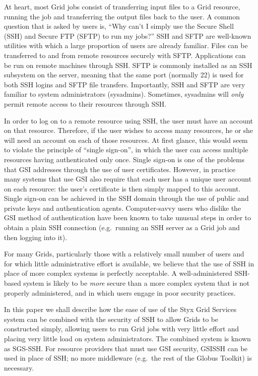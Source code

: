 \documentclass[times,10pt,twocolumn,8.5x11]{article}
\begin{document}
At heart, most Grid jobs consist of transferring input files to a Grid resource, running the job and transferring the output files back to the user.  A common question that is asked by users is, ``Why can't I simply use the Secure Shell (SSH) and Secure FTP (SFTP) to run my jobs?''  SSH and SFTP are 
well-known utilities with which a large proportion of users are already familiar.  Files can be transferred to and from remote resources securely with SFTP.  Applications can be run on remote machines through SSH.  SFTP is commonly installed as an SSH subsystem on the server, meaning that the same port (normally 22) is used for both SSH logins and SFTP file transfers.   Importantly, SSH and SFTP are very familiar to system administrators (sysadmins).  Sometimes, sysadmins will {\em only\/} permit remote access to their resources through SSH.

In order to log on to a remote resource using SSH, the user must have an account on that resource.  Therefore, if the user wishes to access many resources, he or she will need an account on each of those resources.  At first glance, this would seem to violate the principle of ``single sign-on'', in which the user can access multiple resources having authenticated only once.  Single sign-on is one of the problems that GSI addresses through the use of user certificates.  However, in practice many systems that use GSI also require that each user has a unique user account on each resource: the user's certificate is then simply mapped to this account.  Single sign-on can be achieved in the SSH domain through the use of public and private keys and authentication agents.  Computer-savvy users who dislike the GSI method of authentication have been known to take unusual steps in order to obtain a plain SSH connection (e.g.\ running an SSH server as a Grid job and then logging into it).

For many Grids, particularly those with a relatively small number of users and for which little administrative effort is available, we believe that the use of SSH in place of more complex systems is perfectly acceptable.  A well-administered SSH-based system is likely to be {\em more\/} secure than a more complex system that is not properly administered, and in which users engage in poor security practices.

In this paper we shall describe how the ease of use of the Styx Grid Services system can be combined with the security of SSH to allow Grids to be constructed simply, allowing users to run Grid jobs with very little effort and placing very little load on system administrators.  The combined system is known as SGS-SSH.  For resource providers that must use GSI security, GSISSH can be used in place of SSH; no more middleware (e.g.\ the rest of the Globus Toolkit) is necessary.
\end{document}
